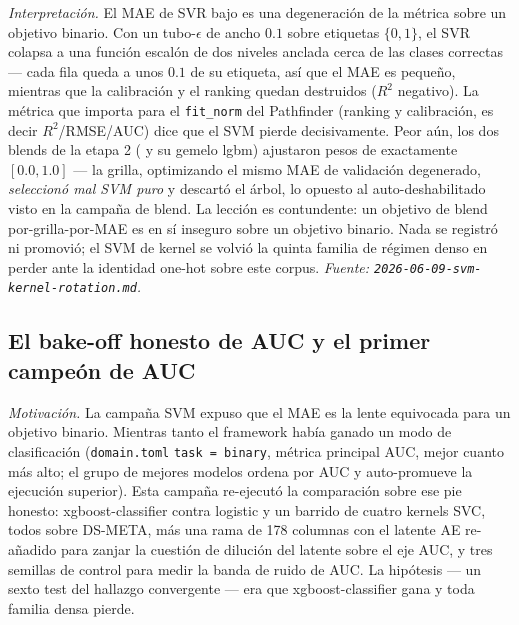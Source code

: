 \documentclass[11pt]{article}
\newcommand{\runid}[1]{\texttt{\small\seqsplit{#1}}}
\newcommand{\rsq}{$R^2$}
\begin{document}
\emph{Interpretación.} El MAE de SVR bajo es una degeneración de la métrica sobre
un objetivo binario. Con un tubo-$\epsilon$ de ancho $0.1$ sobre etiquetas
$\{0,1\}$, el SVR colapsa a una función escalón de dos niveles anclada cerca de
las clases correctas --- cada fila queda a unos $0.1$ de su etiqueta, así que el
MAE es pequeño, mientras que la calibración y el ranking quedan destruidos
(\rsq{} negativo). La métrica que importa para el \texttt{fit\_norm} del
Pathfinder (ranking y calibración, es decir \rsq{}/RMSE/AUC) dice que el SVM
pierde decisivamente. Peor aún, los dos blends de la etapa 2
(\runid{run-20260609-143114-528ef-blend} y su gemelo lgbm) ajustaron pesos de
exactamente $[0.0, 1.0]$ --- la grilla, optimizando el mismo MAE de validación
degenerado, \emph{seleccionó mal SVM puro} y descartó el árbol, lo opuesto al
auto-deshabilitado visto en la campaña de blend. La lección es contundente: un
objetivo de blend por-grilla-por-MAE es en sí inseguro sobre un objetivo binario.
Nada se registró ni promovió; el SVM de kernel se volvió la quinta familia de
régimen denso en perder ante la identidad one-hot sobre este corpus.
\emph{Fuente: \texttt{2026-06-09-svm-kernel-rotation.md}.}

\subsection{El bake-off honesto de AUC y el primer campeón de AUC}
\label{sec:auc}
\emph{Motivación.} La campaña SVM expuso que el MAE es la lente equivocada para
un objetivo binario. Mientras tanto el framework había ganado un modo de
clasificación (\texttt{domain.toml} \texttt{task = binary}, métrica principal
AUC, mejor cuanto más alto; el grupo de mejores modelos ordena por AUC y
auto-promueve la ejecución superior). Esta campaña re-ejecutó la comparación sobre
ese pie honesto: xgboost-classifier contra logistic y un barrido de cuatro
kernels SVC, todos sobre DS-META, más una rama de 178 columnas con el latente AE
re-añadido para zanjar la cuestión de dilución del latente sobre el eje AUC, y
tres semillas de control para medir la banda de ruido de AUC. La hipótesis --- un
sexto test del hallazgo convergente --- era que xgboost-classifier gana y toda
familia densa pierde.
\end{document}
